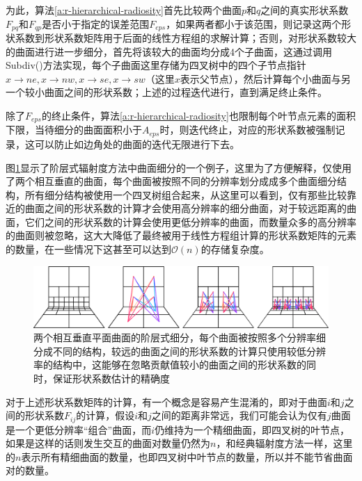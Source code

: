 为此，算法\ref{a:r-hierarchical-radiosity}首先比较两个曲面$p$和$q$之间的真实形状系数$F_{pq}$和$F_{qp}$是否小于指定的误差范围$F_{eps}$，如果两者都小于该范围，则记录这两个形状系数到形状系数矩阵用于后面的线性方程组的求解计算；否则，对形状系数较大的曲面进行进一步细分，首先将该较大的曲面均分成4个子曲面，这通过调用Subdiv()方法实现，每个子曲面这里存储为四叉树中的四个子节点指针$x\to ne,x\to nw,x\to se,x\to sw$（这里$x$表示父节点），然后计算每个小曲面与另一个较小曲面之间的形状系数；上述的过程迭代进行，直到满足终止条件。

除了$F_{eps}$的终止条件，算法\ref{a:r-hierarchical-radiosity}也限制每个叶节点元素的面积下限，当待细分的曲面面积小于$A_{eps}$时，则迭代终止，对应的形状系数被强制记录，这可以防止如边角处的曲面的迭代无限进行下去。

图\ref{f:r-hierarchical-interactions}显示了阶层式辐射度方法中曲面细分的一个例子，这里为了方便解释，仅使用了两个相互垂直的曲面，每个曲面被按照不同的分辨率划分成成多个曲面细分结构，所有细分结构被使用一个四叉树组合起来，从这里可以看到，仅有那些比较靠近的曲面之间的形状系数的计算才会使用高分辨率的细分曲面，对于较远距离的曲面，它们之间的形状系数的计算会使用更低分辨率的曲面，而数量众多的高分辨率的曲面则被忽略，这大大降低了最终被用于线性方程组计算的形状系数矩阵的元素的数量，在一些情况下这甚至可以达到$\mathcal{O}(n)$的存储复杂度。

\begin{figure}
\begin{fullwidth}
	\includegraphics[width=1.0\thewidth]{figures/r/hierarchical-interactions}
	\caption{两个相互垂直平面曲面的阶层式细分，每个曲面被按照多个分辨率细分成不同的结构，较远的曲面之间的形状系数的计算只使用较低分辨率的结构中，这能够在忽略贡献值较小的曲面之间的形状系数的同时，保证形状系数估计的精确度}
	\label{f:r-hierarchical-interactions}
\end{fullwidth}
\end{figure}

对于上述形状系数矩阵的计算，有一个概念是容易产生混淆的，即对于曲面$i$和$j$之间的形状系数$F_{ij}$的计算，假设$i$和$j$之间的距离非常远，我们可能会认为仅有$j$曲面是一个更低分辨率“组合”曲面，而$i$仍维持为一个精细曲面，即四叉树的叶节点，如果是这样的话则发生交互的曲面对数量仍然为$n$，和经典辐射度方法一样，这里的$n$表示所有精细曲面的数量，也即四叉树中叶节点的数量，所以并不能节省曲面对的数量。

